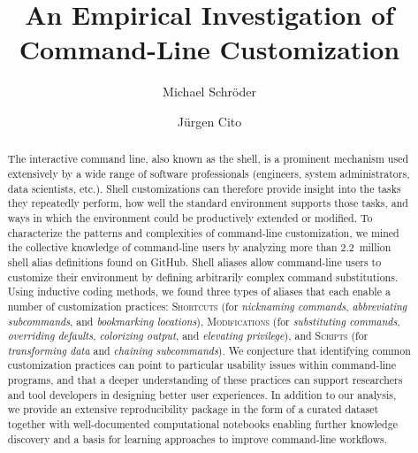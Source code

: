 \documentclass[sigconf,nonacm,screen]{acmart}
\begin{document}
\title{An Empirical Investigation of Command-Line Customization}

\author{Michael Schröder}

\author{Jürgen Cito}

\begin{abstract}
	The interactive command line, also known as the shell, is a prominent mechanism used extensively by a wide range of software professionals (engineers, system administrators, data scientists, etc.). Shell customizations can therefore provide insight into the tasks they repeatedly perform, how well the standard environment supports those tasks, and ways in which the environment could be productively extended or modified.
	To characterize the patterns and complexities of command-line customization, we mined the collective knowledge of command-line users by analyzing more than 2.2~million shell alias definitions found on GitHub.
	Shell aliases allow command-line users to customize their environment by defining arbitrarily complex command substitutions.
	Using inductive coding methods, we found three types of aliases that each enable a number of customization practices: 
	\textsc{Shortcuts} (for \emph{nicknaming commands}, \emph{abbreviating subcommands}, and \emph{bookmarking locations}),
	\textsc{Modifications} (for \emph{substituting commands}, \emph{overriding defaults}, \emph{colorizing output}, and \emph{elevating privilege}),
	and \textsc{Scripts} (for \emph{transforming data} and \emph{chaining subcommands}).
	We conjecture that identifying common customization practices can point to particular usability issues within command-line programs, and that a deeper understanding of these practices can support researchers and tool developers in designing better user experiences.
	In addition to our analysis, we provide an extensive reproducibility package in the form of a curated dataset together with well-documented computational notebooks enabling further knowledge discovery and a basis for learning approaches to improve command-line workflows.
\end{abstract}

\end{document}
